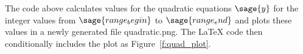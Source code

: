 \documentclass{article}
\begin{document}
The code above calculates values for the quadratic equations $\sage{y}$ for the integer values from $\sage{range_begin}$ to $\sage{range_end}$ and plots these values in a newly generated file quadratic.png.  The LaTeX code then conditionally includes the plot as Figure~\ref{f:quad_plot}.

\end{document}
